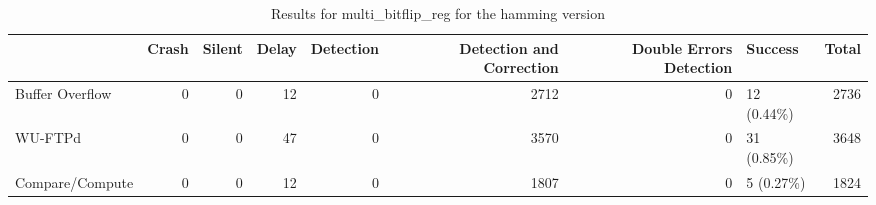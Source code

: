 \begin{table}[t]
	\centering
	\caption{Results for multi_bitflip_reg for the hamming version}
	\label{table:end_sim_by_status_hamming_4_multi_bitflip_reg}
	\begin{tabular}{lrrrrrrlr}
		\toprule
		                & Crash & Silent & Delay & Detection & Detection and Correction & Double Errors Detection & Success     & Total \\
		\midrule
		Buffer Overflow & 0     & 0      & 12    & 0         & 2712                     & 0                       & 12 (0.44\%) & 2736  \\
		WU-FTPd         & 0     & 0      & 47    & 0         & 3570                     & 0                       & 31 (0.85\%) & 3648  \\
		Compare/Compute & 0     & 0      & 12    & 0         & 1807                     & 0                       & 5 (0.27\%)  & 1824  \\
		\bottomrule
	\end{tabular}
\end{table}
